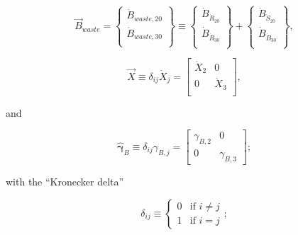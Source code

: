 \begin{equation} \label{eq:waste_vec_def}
	\vec{B}_{waste} 
	=
	\begin{Bmatrix}
		\dot{B}_{waste,{20}}	\\
		\dot{B}_{waste,{30}}	\\
	\end{Bmatrix}
	\equiv
	\begin{Bmatrix}
		\dot{B}_{\dot{R}_{20}}	\\
		\dot{B}_{\dot{R}_{30}}	\\
	\end{Bmatrix}
	+
	\begin{Bmatrix}
		\dot{B}_{\dot{S}_{20}}	\\
		\dot{B}_{\dot{B}_{30}}	\\
	\end{Bmatrix},
\end{equation} 

\begin{equation} \label{eq:X_hat_matrix_def}
	\hat{\vec{X}} 
	\equiv
	\delta_{ij} \dot{X}_{j} 
	= 
	\begin{bmatrix}
		\dot{X}_{2}		&	0	  \\
		0				&	\dot{X}_{3}	\\
	\end{bmatrix},
\end{equation} 

\noindent{}and

\begin{equation} \label{eq:gamma_hat_matrix_def}
	\hat{\boldsymbol{\gamma}}_{B}
	\equiv
	\delta_{ij} \gamma_{B,j}
	=
	\begin{bmatrix}
		\gamma_{B,2} & 0         \\
		0            & \gamma_{B,3}
	\end{bmatrix};
\end{equation}

\noindent{}with the ``Kronecker delta''

\begin{equation}\label{eq:k_delta}
	\delta_{ij} 
	\equiv
	\begin{cases}	
		0	&	\text{if  } i \neq j	\\
		1 	& 	\text{if  } i = j
	\end{cases};
\end{equation}

